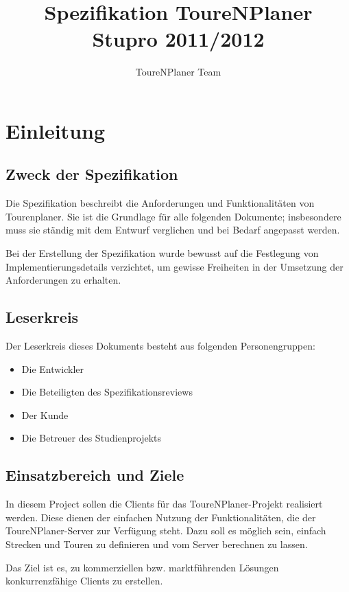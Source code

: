 \documentclass[a4paper,10pt,titlepage]{article}
\author{ToureNPlaner Team}
\title{Spezifikation ToureNPlaner\\ Stupro 2011/2012}
\begin{document}
\maketitle
{}
\setcounter{page}{1}
\tableofcontents
\clearpage
{}
\setcounter{page}{1}

\section{Einleitung}
\subsection{Zweck der Spezifikation}
Die Spezifikation beschreibt die Anforderungen und Funktionalitäten von Tourenplaner. Sie ist die Grundlage für alle folgenden Dokumente; insbesondere muss sie ständig mit dem Entwurf verglichen und bei Bedarf angepasst werden.

Bei der Erstellung der Spezifikation wurde bewusst auf die Festlegung von Implementierungsdetails verzichtet, um gewisse Freiheiten in der Umsetzung der Anforderungen zu erhalten.

\subsection{Leserkreis}
Der Leserkreis dieses Dokuments besteht aus folgenden Personengruppen:
\begin{itemize}
\item Die Entwickler
\item Die Beteiligten des Spezifikationsreviews
\item Der Kunde
\item Die Betreuer des Studienprojekts
\end{itemize}

\subsection{Einsatzbereich und Ziele}

In diesem Project sollen die Clients für das ToureNPlaner-Projekt realisiert werden.
Diese dienen der einfachen Nutzung der Funktionalitäten, die der ToureNPlaner-Server zur Verfügung steht.
Dazu soll es möglich sein, einfach Strecken und Touren zu definieren und vom Server berechnen zu lassen.

\noindent Das Ziel ist es, zu kommerziellen bzw. marktführenden Lösungen konkurrenzfähige Clients zu erstellen.
\end{document}
